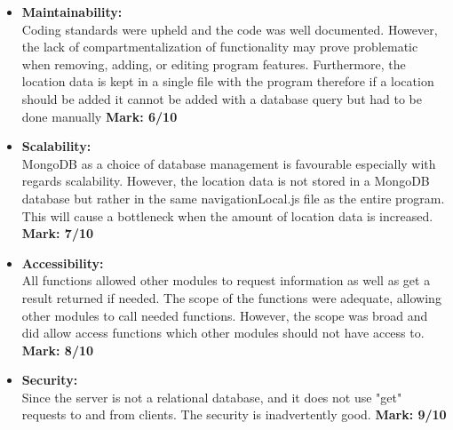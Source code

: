 \begin{itemize}
	
	\item \textbf{Maintainability:}\\Coding standards were upheld and the code was well documented. However, the lack of compartmentalization of functionality may prove problematic when  removing, adding, or editing program features. Furthermore, the location data is kept in a single file with the program therefore if a location should be added it cannot be added with a database query but had to be done manually \textbf{Mark: 6/10}
	\item \textbf{Scalability:}\\MongoDB as a choice of database management is favourable especially with regards scalability. However, the location data is not stored in a MongoDB database but rather in the same navigationLocal.js file as the entire program. This will cause a bottleneck when the amount of location data is increased. \textbf{Mark: 7/10}
	\item \textbf{Accessibility:}\\All functions allowed other modules to request information as well as get a result returned if needed. The scope of the functions were adequate, allowing other modules to call needed functions. However, the scope was broad and did allow access functions which other modules should not have access to. \textbf{Mark: 8/10}
	\item \textbf{Security:}\\Since the server is not a relational database, and it does not use "get" requests to and from clients. The security is inadvertently good. \textbf{Mark: 9/10}
	
\end{itemize}